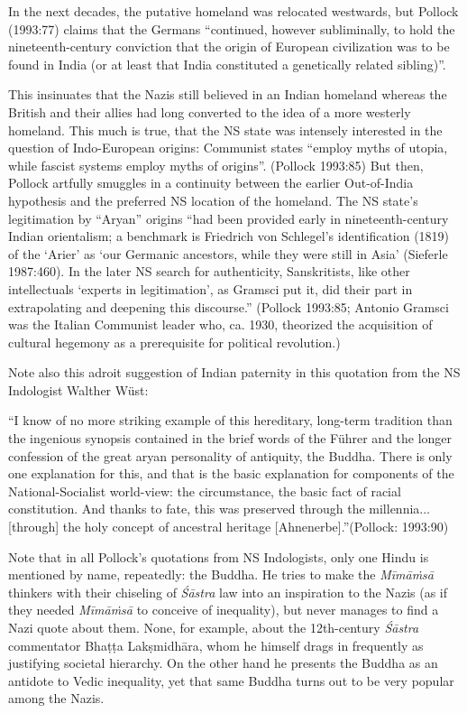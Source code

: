 In the next decades, the putative homeland was relocated westwards, but Pollock (1993:77) claims that the Germans “continued, however subliminally, to hold the nineteenth-century conviction that the origin of European civilization was to be found in India (or at least that India constituted a genetically related sibling)”. 

This insinuates that the Nazis still believed in an Indian homeland whereas the British and their allies had long converted to the idea of a more westerly homeland. This much is true, that the NS state was intensely interested in the question of Indo-European origins: Communist states “employ myths of utopia, while fascist systems employ myths of origins”. (Pollock 1993:85) But then, Pollock artfully smuggles in a continuity between the earlier Out-of-India hypothesis and the preferred NS location of the homeland. The NS state’s legitimation by “Aryan” origins “had been provided early in nineteenth-century Indian orientalism; a benchmark is Friedrich von Schlegel's identification (1819) of the ‘Arier’ as ‘our Germanic ancestors, while they were still in Asia’ (Sieferle 1987:460). In the later NS search for authenticity, Sanskritists, like other intellectuals ‘experts in legitimation’, as Gramsci put it, did their part in extrapolating and deepening this discourse.” (Pollock 1993:85; Antonio Gramsci was the Italian Communist leader who, ca. 1930, theorized the acquisition of cultural hegemony as a prerequisite for political revolution.)

Note also this adroit suggestion of Indian paternity in this quotation from the NS Indologist Walther Wüst: 
\begin{myquote}
“I know of no more striking example of this hereditary, long-term tradition than the ingenious synopsis contained in the brief words of the Führer and the longer confession of the great aryan personality of antiquity, the Buddha. There is only one explanation for this, and that is the basic explanation for components of the National-Socialist world-view: the circumstance, the basic fact of racial constitution. And thanks to fate, this was preserved through the millennia$\ldots$ [through] the holy concept of ancestral heritage [Ahnenerbe].”\hfill (Pollock: 1993:90)
\end{myquote}

Note that in all Pollock’s quotations from NS Indologists, only one Hindu is mentioned by name, repeatedly: the Buddha. He tries to make the {\sl Mīmāṁsā} thinkers with their chiseling of {\sl Śāstra} law into an inspiration to the Nazis (as if they needed {\sl Mīmāṁsā} to conceive of inequality), but never manages to find a Nazi quote about them. None, for example, about the 12th-century {\sl Śāstra} commentator Bhaṭṭa Lakṣmidhāra, whom he himself drags in frequently as justifying societal hierarchy. On the other hand he presents the Buddha as an antidote to Vedic inequality, yet that same Buddha turns out to be very popular among the Nazis.

